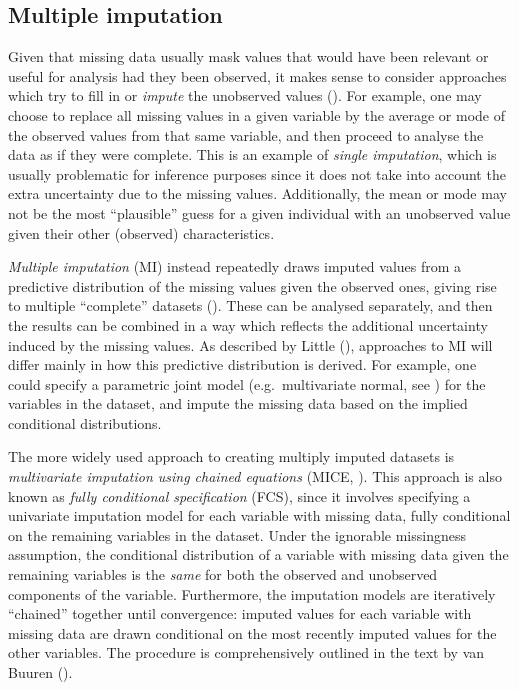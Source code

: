 \documentclass[
  letterpaper,
  paper=240mm:170mm,
  twoside=true,
  open=right,
  fontsize=10pt,
  pagesize=false,
  BCOR=15mm,
  DIV=14,
  headinclude=true,
  footinclude=false,
  headsepline=on]{scrbook}
\begin{document}
\subsection{Multiple imputation}\label{multiple-imputation}

Given that missing data usually mask values that would have been
relevant or useful for analysis had they been observed, it makes sense
to consider approaches which try to fill in or \emph{impute} the
unobserved values
(). For example, one may choose to replace all missing values in a
given variable by the average or mode of the observed values from that
same variable, and then proceed to analyse the data as if they were
complete. This is an example of \emph{single imputation}, which is
usually problematic for inference purposes since it does not take into
account the extra uncertainty due to the missing values. Additionally,
the mean or mode may not be the most ``plausible'' guess for a given
individual with an unobserved value given their other (observed)
characteristics.

\emph{Multiple imputation} (MI) instead repeatedly draws imputed values
from a predictive distribution of the missing values given the observed
ones, giving rise to multiple ``complete'' datasets
(). These can be analysed
separately, and then the results can be combined in a way which reflects
the additional uncertainty induced by the missing values. As described
by Little (),
approaches to MI will differ mainly in how this predictive distribution
is derived. For example, one could specify a parametric joint model
(e.g.~multivariate normal, see ) for the variables in the dataset, and impute the
missing data based on the implied conditional distributions.

The more widely used approach to creating multiply imputed datasets is
\emph{multivariate imputation using chained equations} (MICE,
). This approach is also known as \emph{fully
conditional specification} (FCS), since it involves specifying a
univariate imputation model for each variable with missing data, fully
conditional on the remaining variables in the dataset. Under the
ignorable missingness assumption, the conditional distribution of a
variable with missing data given the remaining variables is the
\emph{same} for both the observed and unobserved components of the
variable. Furthermore, the imputation models are iteratively ``chained''
together until convergence: imputed values for each variable with
missing data are drawn conditional on the most recently imputed values
for the other variables. The procedure is comprehensively outlined in
the text by van Buuren
().
\end{document}
